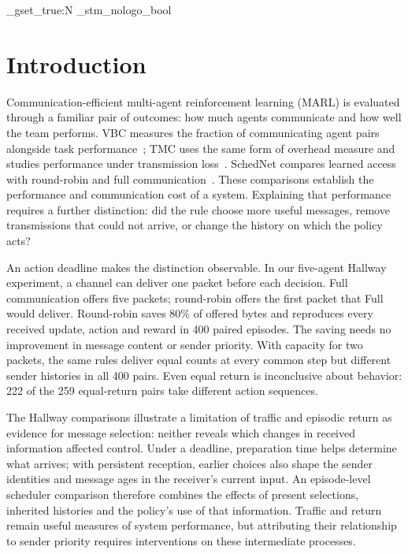 \documentclass[a4paper,fleqn]{cas-dc}
\begin{document}
\ExplSyntaxOn
\bool_gset_true:N \g_stm_nologo_bool
\ExplSyntaxOff
\maketitle
\section{Introduction}
Communication-efficient multi-agent reinforcement learning (MARL) is evaluated through a familiar pair of outcomes: how much agents communicate and how well the team performs. VBC measures the fraction of communicating agent pairs alongside task performance~\citep{zhang2019efficient}; TMC uses the same form of overhead measure and studies performance under transmission loss~\citep{zhang2020succinct}. SchedNet compares learned access with round-robin and full communication~\citep{kim2019schedule}. These comparisons establish the performance and communication cost of a system. Explaining that performance requires a further distinction: did the rule choose more useful messages, remove transmissions that could not arrive, or change the history on which the policy acts?

An action deadline makes the distinction observable. In our five-agent Hallway experiment, a channel can deliver one packet before each decision. Full communication offers five packets; round-robin offers the first packet that Full would deliver. Round-robin saves 80\% of offered bytes and reproduces every received update, action and reward in 400 paired episodes. The saving needs no improvement in message content or sender priority. With capacity for two packets, the same rules deliver equal counts at every common step but different sender histories in all 400 pairs. Even equal return is inconclusive about behavior: 222 of the 259 equal-return pairs take different action sequences.

The Hallway comparisons illustrate a limitation of traffic and episodic return as evidence for message selection: neither reveals which changes in received information affected control. Under a deadline, preparation time helps determine what arrives; with persistent reception, earlier choices also shape the sender identities and message ages in the receiver's current input. An episode-level scheduler comparison therefore combines the effects of present selections, inherited histories and the policy's use of that information. Traffic and return remain useful measures of system performance, but attributing their relationship to sender priority requires interventions on these intermediate processes.
\end{document}
